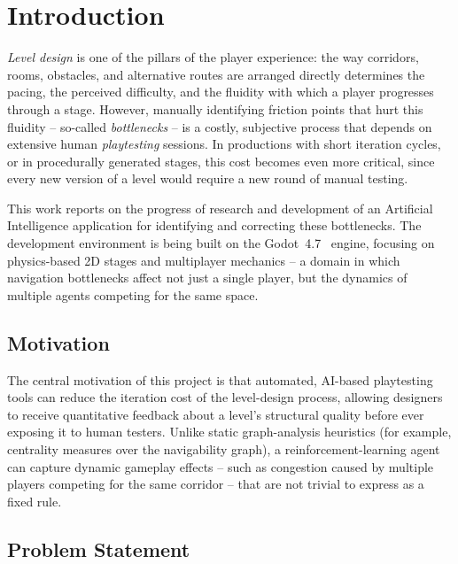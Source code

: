 \documentclass[sigconf,nonacm,language=english]{acmart}
\begin{document}
\maketitle

\section{Introduction}

\emph{Level design} is one of the pillars of the player experience: the way
corridors, rooms, obstacles, and alternative routes are arranged directly
determines the pacing, the perceived difficulty, and the fluidity with
which a player progresses through a stage. However, manually identifying
friction points that hurt this fluidity -- so-called \emph{bottlenecks} --
is a costly, subjective process that depends on extensive human
\emph{playtesting} sessions. In productions with short iteration cycles, or
in procedurally generated stages, this cost becomes even more critical,
since every new version of a level would require a new round of manual
testing.

This work reports on the progress of research and development of an
Artificial Intelligence application for identifying and correcting these
bottlenecks. The development environment is being built on the
Godot~4.7~\cite{godotengine} engine, focusing on physics-based 2D stages
and multiplayer mechanics -- a domain in which navigation bottlenecks
affect not just a single player, but the dynamics of multiple agents
competing for the same space.

\subsection{Motivation}

The central motivation of this project is that automated, AI-based
playtesting tools can reduce the iteration cost of the level-design
process, allowing designers to receive quantitative feedback about a
level's structural quality before ever exposing it to human testers.
Unlike static graph-analysis heuristics (for example, centrality measures
over the navigability graph), a reinforcement-learning agent can capture
dynamic gameplay effects -- such as congestion caused by multiple players
competing for the same corridor -- that are not trivial to express as a
fixed rule.

\subsection{Problem Statement}
\end{document}
